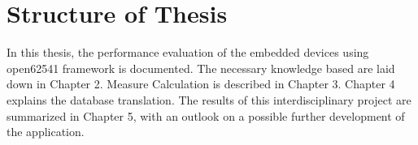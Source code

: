 

\section{Structure of Thesis}

In this thesis, the performance evaluation of the embedded devices using open62541 framework is documented. The necessary knowledge based are laid down in Chapter 2. Measure Calculation is described in Chapter 3. Chapter 4 explains the database translation. The results of this interdisciplinary project are summarized in Chapter 5, with an outlook on a possible further development of the application. 
